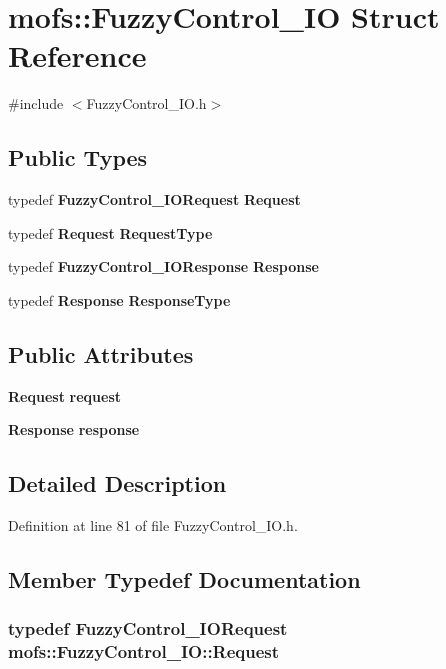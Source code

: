 \section{mofs\-:\-:Fuzzy\-Control\-\_\-\-I\-O Struct Reference}
\label{structmofs_1_1FuzzyControl__IO}


{\ttfamily \#include $<$Fuzzy\-Control\-\_\-\-I\-O.\-h$>$}

\subsection*{Public Types}
\begin{DoxyCompactItemize}
\item 
typedef {\bf Fuzzy\-Control\-\_\-\-I\-O\-Request} {\bf Request}
\item 
typedef {\bf Request} {\bf Request\-Type}
\item 
typedef {\bf Fuzzy\-Control\-\_\-\-I\-O\-Response} {\bf Response}
\item 
typedef {\bf Response} {\bf Response\-Type}
\end{DoxyCompactItemize}
\subsection*{Public Attributes}
\begin{DoxyCompactItemize}
\item 
{\bf Request} {\bf request}
\item 
{\bf Response} {\bf response}
\end{DoxyCompactItemize}


\subsection{Detailed Description}


Definition at line 81 of file Fuzzy\-Control\-\_\-\-I\-O.\-h.



\subsection{Member Typedef Documentation}
\subsubsection[{Request}]{\setlength{\rightskip}{0pt plus 5cm}typedef {\bf Fuzzy\-Control\-\_\-\-I\-O\-Request} {\bf mofs\-::\-Fuzzy\-Control\-\_\-\-I\-O\-::\-Request}}\label{structmofs_1_1FuzzyControl__IO_a2a71684b8b3b362786c0c7cb3ff35613}


